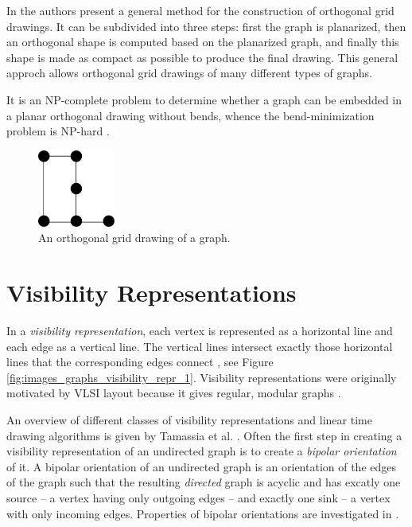 In \cite{Batini1984,Tamassia1988} the authors present a general method for the
construction of orthogonal grid drawings. It can be subdivided into three
steps: first the graph is planarized, then an orthogonal shape is computed
based on the planarized graph, and finally this shape is made as compact as
possible to produce the final drawing. This general approch allows orthogonal
grid drawings of many different types of graphs.

It is an NP-complete problem to determine whether a graph can be embedded in a
planar orthogonal drawing without bends, whence the bend-minimization problem
is NP-hard \cite{Garg1994}.

\begin{figure}[htp]
	\centering
		\includegraphics[height=1in]{../images/graphs/orthogonal_1.pdf}
	\caption{An orthogonal grid drawing of a graph.}
	\label{fig:images_graphs_orthogonal_1}
\end{figure}

\section{Visibility Representations}

In a \emph{visibility representation}, each vertex is represented as a
horizontal line and each edge as a vertical line. The vertical lines intersect
exactly those horizontal lines that the corresponding edges connect
\cite{Duchet1983}, see Figure \ref{fig:images_graphs_visibility_repr_1}.
Visibility representations were originally motivated by VLSI layout because it
gives regular, modular graphs \cite{Schlag1985}.

An overview of different classes of visibility representations and linear time
drawing algorithms is given by Tamassia et al. \cite{Tamassia1986}. Often the
first step in creating a visibility representation of an undirected graph is
to create a \emph{bipolar orientation} of it. A bipolar orientation of an
undirected graph is an orientation of the edges of the graph such that the
resulting \emph{directed} graph is acyclic and has excatly one source -- a
vertex having only outgoing edges -- and exactly one sink -- a vertex with
only incoming edges. Properties of bipolar orientations are investigated in
\cite{Fraysseix1993}.

